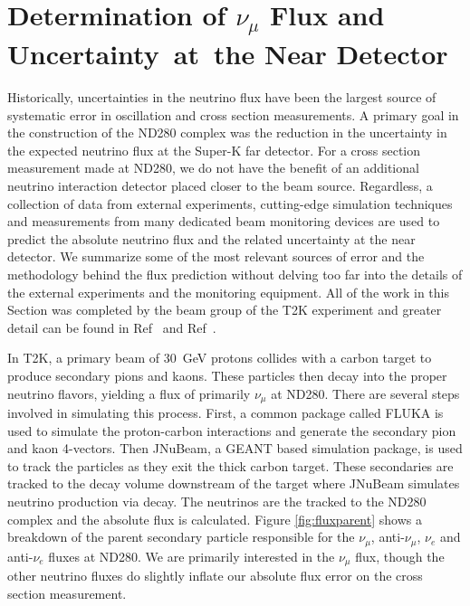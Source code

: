\section{Determination of $\nu_\mu$ Flux and Uncertainty~at~the Near Detector}
\label{sec:FluxDetermination}

Historically, uncertainties in the neutrino flux have been the largest source of systematic error in oscillation and cross section measurements. A primary goal in the construction of the ND280 complex was the reduction in the uncertainty in the expected neutrino flux at the Super-K far detector. For a cross section measurement made at ND280, we do not have the benefit of an additional neutrino interaction detector placed closer to the beam source. Regardless, a collection of data from external experiments, cutting-edge simulation techniques and measurements from many dedicated beam monitoring devices are used to predict the absolute neutrino flux and the related uncertainty at the near detector. We summarize some of the most relevant sources of error and the methodology behind the flux prediction without delving too far into the details of the external experiments and the monitoring equipment. All of the work in this Section was completed by the beam group of the T2K experiment and greater detail can be found in Ref~\cite{fluxpred} and Ref~\cite{fluxtn}.

In T2K, a primary beam of 30~GeV protons collides with a carbon target to produce secondary pions and kaons. These particles then decay into the proper neutrino flavors, yielding a flux of primarily $\nu_\mu$ at ND280. There are several steps involved in simulating this process. First, a common package called FLUKA is used to simulate the proton-carbon interactions and generate the secondary pion and kaon 4-vectors. Then JNuBeam, a GEANT based simulation package, is used to track the particles as they exit the thick carbon target. These secondaries are tracked to the decay volume downstream of the target where JNuBeam simulates neutrino production via decay. The neutrinos are the tracked to the ND280 complex and the absolute flux is calculated. Figure \ref{fig:fluxparent} shows a breakdown of the parent secondary particle responsible for the  $\nu_\mu$, anti-$\nu_\mu$, $\nu_e$ and anti-$\nu_e$ fluxes at ND280. We are primarily interested in the $\nu_\mu$ flux, though the other neutrino fluxes do slightly inflate our absolute flux error on the cross section measurement.

